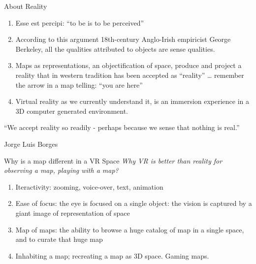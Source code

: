 \documentclass{beamer}
\begin{document}
\begin{frame}{About Reality}
	\begin{enumerate}
		\item Esse est percipi: ``to be is to be perceived''
		\item According to this argument 18th-century Anglo-Irish empiricist George Berkeley, all the qualities attributed to objects are sense qualities.

		\item Maps as representations, an objectification of space, produce and project a reality that in western tradition has been accepted as ``reality'' … remember the arrow in a map telling: ``you are here''

		\item Virtual reality as we currently understand it, is an immersion experience in a 3D computer generated environment. 
	\end{enumerate}

	``We accept reality so readily - perhaps because we sense that nothing is real.''\par
	\hfill Jorge Luis Borges \par
\end{frame}

\begin{frame}{Why is a map different in a VR Space}
	\textit{Why VR is better than reality for observing a map, playing with a map?}
	\begin{enumerate}
		\item Iteractivity: zooming, voice-over, text, animation
		\item Ease of focus: the eye is focused on a single object: the
			vision is captured by a giant image of representation of space
		\item Map of maps: the ability to browse a huge catalog of map in a single
			space, and to curate that huge map
		\item Inhabiting a map; recreating a map as 3D space. Gaming maps.
	\end{enumerate}
\end{frame}
\end{document}

